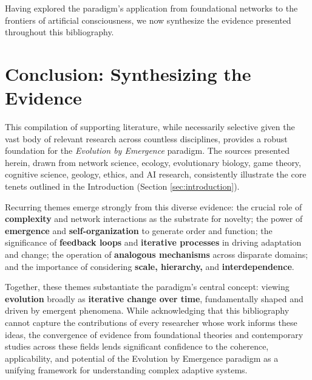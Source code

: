 \documentclass[12pt,openany]{book}
\let\cleardoublepage\clearpage %
\begin{document}
Having explored the paradigm's application from foundational networks to the frontiers of artificial consciousness, we now synthesize the evidence presented throughout this bibliography.

\section*{Conclusion: Synthesizing the Evidence} \label{sec:conclusion}

This compilation of supporting literature, while necessarily selective given the vast body of relevant research across countless disciplines, provides a robust foundation for the \emph{Evolution by Emergence} paradigm. The sources presented herein, drawn from network science, ecology, evolutionary biology, game theory, cognitive science, geology, ethics, and AI research, consistently illustrate the core tenets outlined in the Introduction (Section \ref{sec:introduction}).

Recurring themes emerge strongly from this diverse evidence: the crucial role of \textbf{complexity} and network interactions as the substrate for novelty; the power of \textbf{emergence} and \textbf{self-organization} to generate order and function; the significance of \textbf{feedback loops} and \textbf{iterative processes} in driving adaptation and change; the operation of \textbf{analogous mechanisms} across disparate domains; and the importance of considering \textbf{scale, hierarchy,} and \textbf{interdependence}.

Together, these themes substantiate the paradigm's central concept: viewing \textbf{evolution} broadly as \textbf{iterative change over time}, fundamentally shaped and driven by emergent phenomena. While acknowledging that this bibliography cannot capture the contributions of every researcher whose work informs these ideas, the convergence of evidence from foundational theories and contemporary studies across these fields lends significant confidence to the coherence, applicability, and potential of the Evolution by Emergence paradigm as a unifying framework for understanding complex adaptive systems.


\cleardoublepage %
\end{document}
